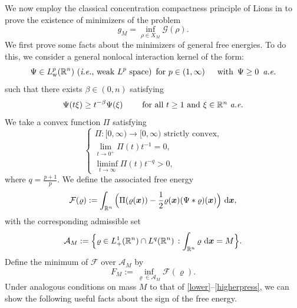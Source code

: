 \documentclass[reqno,11pt]{amsart}
\numberwithin{equation}{section}
\theoremstyle{definition}
\def\dd{{\, \rm d}}
\begin{document}
We now employ the classical concentration compactness principle of Lions 
in \cite[Theorem II.2]{Lions_1984} to prove the existence of minimizers of the problem
\begin{equation*}
g_M = \inf_{\rho \in X_M} \mathcal{G}(\rho).
\end{equation*}
We first prove some facts about the minimizers of general free energies. 
To do this, we consider a general nonlocal interaction kernel of the form: 
\begin{equation}\label{potential}
\Psi \in L^p_{\rm w}(\mathbb{R}^n) \,\,{\rm (}\text{{\it i.e.}, weak $L^p$ space{\rm )}}\,\,\,
\text{for $p \in (1,\infty)$
\,\,\,\,\,  with $\,\Psi \geq 0\,$  {\it a.e.}}
\end{equation}
such that there exists $\beta \in (0,n)$ satisfying
\begin{equation}\label{Psi}
\Psi(t \xi) \geq t^{-\beta} \Psi(\xi)
\qquad\mbox{ for all $t \geq 1$ and $\xi \in \mathbb{R}^n$ {\it a.e.}}
\end{equation}
We take a convex function $\Pi$ satisfying
    \begin{equation}\label{convex}
\begin{cases}
\Pi:[0,\infty) \to [0,\infty) \text{ strictly convex,}
\\
 \lim_{t \to 0^+} \Pi(t)t^{-1} = 0, \\
 \liminf_{t \to \infty} \Pi(t)t^{-q} > 0,
  \end{cases}
    \end{equation}
    where $q = \frac{p + 1}{p}$. We define the associated free energy
\begin{equation*}
    \mathcal{F}(\varrho):=\int_{\mathbb{R}^n}\Big(\Pi(\varrho(\boldsymbol{x})) - \frac{1}{2}\varrho(\boldsymbol{x})(\Psi \ast \varrho)(\boldsymbol{x})\Big)\,\dd\boldsymbol{x},
\end{equation*}
with the corresponding admissible set
\begin{equation*}
  \mathcal{A}_M := \Big\{ \varrho \in L^1_+(\mathbb{R}^n) \cap L^q(\mathbb{R}^n) \,:
  \int_{\mathbb{R}^n} \varrho \, \dd \boldsymbol{x} = M \Big\}.
    \end{equation*}
Define the minimum of $\mathcal{F}$ over $\mathcal{A}_M$ by
\begin{equation*}
    F_M := \inf_{\varrho \in \mathcal{A}_M} \mathcal{F}(\varrho).
\end{equation*}
Under analogous conditions on mass $M$ to that of \eqref{lower}--\eqref{higherpress}, 
we can show the following useful facts about the sign of the free energy.
\end{document}
